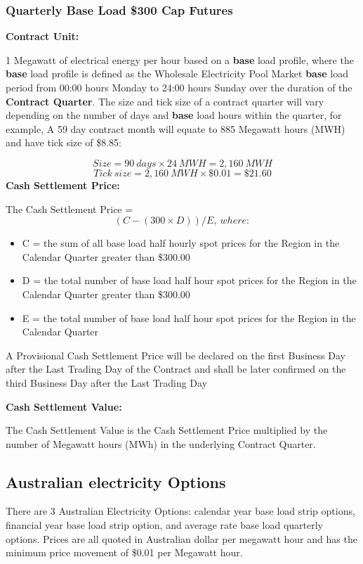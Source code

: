 \documentclass[12pt]{article}
\begin{document}
\subsubsection{Quarterly Base Load \$300 Cap Futures}
\begin{flushleft}
\textbf{Contract Unit:}\par
1 Megawatt of electrical energy per hour based on a \textbf{base} load profile, where the \textbf{base} load profile is defined as the Wholesale Electricity Pool Market \textbf{base} load period from 00:00 hours Monday to 24:00 hours Sunday over the duration of the \textbf{Contract Quarter}. The size and tick size of a contract quarter will vary depending on the number of days and \textbf{base} load hours within the quarter, for example, 
A 59 day contract month will equate to 885 Megawatt hours (MWH) and have tick size of \$8.85:\par
   $$ Size = 90 \ days \times 24 \ MWH = 2,160 \ MWH $$
   $$ Tick\ size = 2,160 \ MWH \times \$0.01 = \$21.60 $$
\frameboxend
\textbf{Cash Settlement Price:}\par
The Cash Settlement Price = $$(C - (300 \times D)) / E,\ where:$$
\begin{itemize}
    \item C = the sum of all base load half hourly spot prices for the Region in the Calendar Quarter greater than \$300.00
    \item D = the total number of base load half hour spot prices for the Region in the Calendar Quarter greater than \$300.00
    \item E = the total number of base load half hour spot prices for the Region in the Calendar Quarter
\end{itemize}
A Provisional Cash Settlement Price will be declared on the first Business Day after the Last Trading Day of the Contract and shall be later confirmed on the third Business Day after the Last Trading Day\par
\textbf{Cash Settlement Value:}\par
The Cash Settlement Value is the Cash Settlement Price multiplied by the number of Megawatt hours (MWh) in the underlying Contract
Quarter.
\end{flushleft}

\subsection{Australian electricity Options}
\begin{flushleft}
There are 3 Australian Electricity Options: calendar year base load strip options, financial year base load strip option, and average rate base load quarterly options. Prices are all quoted in Australian dollar per megawatt hour and has the minimum price movement of \$0.01 per Megawatt hour. 
\end{flushleft}
\end{document}
